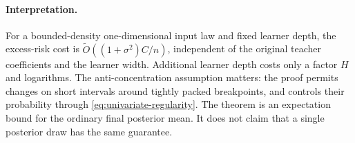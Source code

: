 \paragraph{Interpretation.}
For a bounded-density one-dimensional input law and fixed learner
depth, the excess-risk cost is $\widetilde O((1+\sigma^2)C/n)$,
independent of the original teacher coefficients and the learner
width. Additional learner depth costs only a factor $H$ and logarithms.
The anti-concentration assumption matters: the proof permits changes
on short intervals around tightly packed breakpoints, and controls
their probability through \eqref{eq:univariate-regularity}. The theorem
is an expectation bound for the ordinary final posterior mean. It
does not claim that a single posterior draw has the same guarantee.

